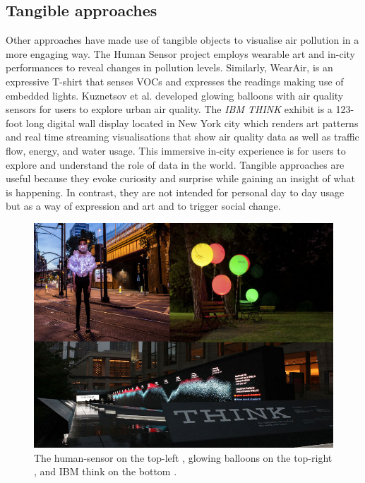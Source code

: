 \subsection{Tangible approaches}
Other approaches have made use of tangible objects to visualise air pollution in a more engaging way. The Human Sensor project \cite{InvisibleDust2016} employs wearable art and in-city performances to reveal changes in pollution levels. Similarly, WearAir, \cite{Kim2010} is an expressive T-shirt that senses VOCs and expresses the readings making use of embedded lights. Kuznetsov et al. \cite{Kuznetsov2011} developed glowing balloons with air quality sensors for users to explore urban air quality. The \textit{IBM THINK} exhibit \cite{IBM2012} is a 123-foot long digital wall display located in New York city which renders art patterns and real time streaming visualisations  that show air quality data as well as traffic flow, energy, and water usage. This immersive in-city experience is for users to explore and understand the role of data in the world. Tangible approaches are useful because they evoke curiosity and surprise while gaining an insight of what is happening. In contrast, they are not intended for personal day to day usage but as a way of expression and art and to trigger social change. 

\begin{figure}[H]
\begin{adjustbox}{width=.8\textwidth,center=\textwidth}
  \centering
  \includegraphics[scale=.4]{images/think_human_sensor_balloons.jpg}
\end{adjustbox}
  \caption[Tangible visualisations]{The human-sensor on the top-left \cite{InvisibleDust2016}, glowing balloons on the top-right \cite{Kuznetsov2011}, and IBM think on the bottom \cite{IBM2012}.}
  \label{fig:photo_based_instaNO2}
\end{figure}

